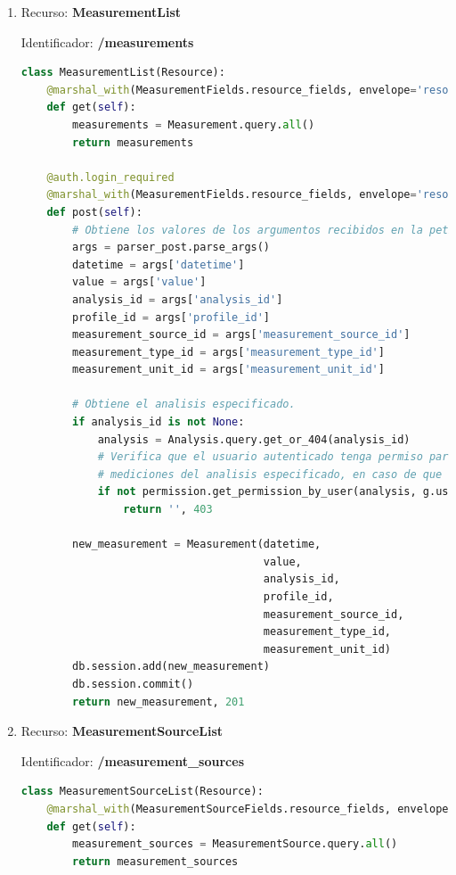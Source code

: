 \begin{enumerate}
\item Recurso: \textbf{MeasurementList}

Identificador: \textbf{/measurements}

\begin{lstlisting}[language=Python]
class MeasurementList(Resource):
    @marshal_with(MeasurementFields.resource_fields, envelope='resource')
    def get(self):
        measurements = Measurement.query.all()
        return measurements

    @auth.login_required
    @marshal_with(MeasurementFields.resource_fields, envelope='resource')
    def post(self):
        # Obtiene los valores de los argumentos recibidos en la peticion.
        args = parser_post.parse_args()
        datetime = args['datetime']
        value = args['value']
        analysis_id = args['analysis_id']
        profile_id = args['profile_id']
        measurement_source_id = args['measurement_source_id']
        measurement_type_id = args['measurement_type_id']
        measurement_unit_id = args['measurement_unit_id']

        # Obtiene el analisis especificado.
        if analysis_id is not None:
            analysis = Analysis.query.get_or_404(analysis_id)
            # Verifica que el usuario autenticado tenga permiso para editar las
            # mediciones del analisis especificado, en caso de que exista.
            if not permission.get_permission_by_user(analysis, g.user, 'edit_measurements'):
                return '', 403

        new_measurement = Measurement(datetime,
                                      value,
                                      analysis_id,
                                      profile_id,
                                      measurement_source_id,
                                      measurement_type_id,
                                      measurement_unit_id)
        db.session.add(new_measurement)
        db.session.commit()
        return new_measurement, 201
\end{lstlisting}

\item 	Recurso: \textbf{MeasurementSourceList}

Identificador: \textbf{/measurement\_sources}

\begin{lstlisting}[language=Python]
class MeasurementSourceList(Resource):
    @marshal_with(MeasurementSourceFields.resource_fields, envelope='resource')
    def get(self):
        measurement_sources = MeasurementSource.query.all()
        return measurement_sources


\end{lstlisting}
\end{enumerate}

